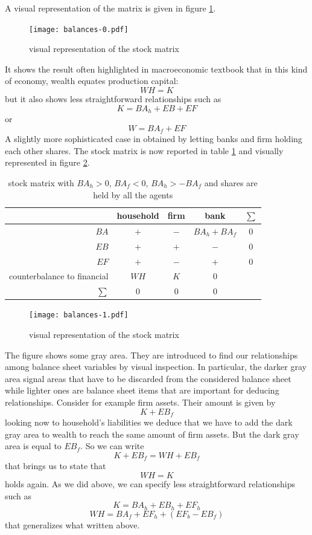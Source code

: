 \documentclass{article}
\begin{document}
A visual representation of the matrix is given in figure \ref{fig:vstock0}.
\begin{figure}[htp]
	\centering
\hskip-1cm
\texttt{[image: balances-0.pdf]}
	\caption{visual representation of the stock matrix}
	\label{fig:vstock0}
\end{figure}
It shows the result often highlighted in macroeconomic textbook that in this kind of economy, wealth equates production capital:
\[WH=K\]
but it also shows less straightforward relationships such as 
\[
	 K=BA_h+EB+EF
\]
or
\[
W=BA_f+EF
\]
A slightly more sophisticated case in obtained by letting banks and firm holding each other shares. The stock matrix is now reported in table \ref{tab:sm2} and visually represented in figure \ref{fig:vstock1}.

\begin{table}[t]
	\centering
\begin{tabular}{r c c c c}
	\hline
	& household 	& \parbox{1.5cm}{\centerline{firm}} & \parbox{1.5cm}{\centerline{bank}} &$\sum$\\
\hline
\hline
$BA$	&	$+$	&$-$	&$BA_h+BA_f$&0\\
$EB$	&	$+$	&$+$	&$-$&0\\
$EF$	&	$+$	&$-$	&$+$&0\\
	\hline
counterbalance to financial	&	$WH$	&$K$	&0\\
	\hline
	\hline
$\sum$ &	0	&0	&0
\end{tabular}
	\caption{stock matrix with $BA_h>0$, $BA_f<0$, $BA_h>-BA_f$ and shares are held by all the agents}
	\label{tab:sm2}
\end{table}

\begin{figure}[t]
	\centering
\hskip-1cm
\texttt{[image: balances-1.pdf]}
	\caption{visual representation of the stock matrix}
	\label{fig:vstock1}
\end{figure}
The figure shows some gray area. They are introduced to find our relationships among balance sheet variables by visual inspection. In particular, the darker gray area signal areas that have to be discarded from the considered balance sheet while lighter ones are balance sheet items that are important for deducing relationships.  Consider for example firm assets. Their amount is given by
\[K+EB_{f}\]
looking now to household's liabilities we deduce that we have to add the dark gray area to wealth to reach the same amount of firm assets. But the dark gray area is equal to $EB_{f}$. So we can write
\[K+EB_{f}=WH+EB_{f}\]
that brings us to state that
\[WH=K\]
holds again. 
As we did above, we can specify less straightforward relationships such as
\[K=BA_h+EB_{h}+EF_{h}\]
\[
	WH=BA_f+EF_{h}+(EF_{b}-EB_{f})
\]
that generalizes what written above.
\end{document}
